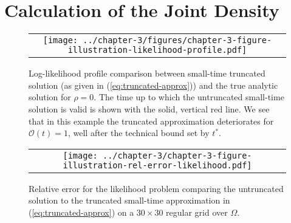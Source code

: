 \section{Calculation of the Joint Density}
\begin{figure}
  \begin{tabular}{c}
    \begin{minipage}{1.00\textwidth}
      \centering
      \texttt{[image: ../chapter-3/figures/chapter-3-figure-illustration-likelihood-profile.pdf]}
      \caption{Log-likelihood profile comparison between small-time
        truncated solution (as given in (\ref{eq:truncated-approx}))
        and the true analytic solution for $\rho=0$. The time up to
        which the untruncated small-time solution is valid is shown
        with the solid, vertical red line. We see that in this example
        the truncated approximation deteriorates for
        $\mathcal{O}(t) = 1$, well after the technical bound set by
        $t^*$.}
      \label{fig:illustration-likelihood-profile}
    \end{minipage}
  \end{tabular}
\end{figure}

\begin{figure}
  \centering
  \begin{tabular}{c}
    \begin{minipage}{0.90\textwidth}
      \centering
      \texttt{[image: ../chapter-3/chapter-3-figure-illustration-rel-error-likelihood.pdf]}
      \caption{Relative error for the likelihood problem comparing the
        untruncated solution to the truncated small-time approximation in
        (\ref{eq:truncated-approx}) on a $30 \times 30$ regular grid
        over $\Omega$. }
      \label{fig:illustration-rel-error-likelihood}
    \end{minipage}
  \end{tabular}
\end{figure}
  
